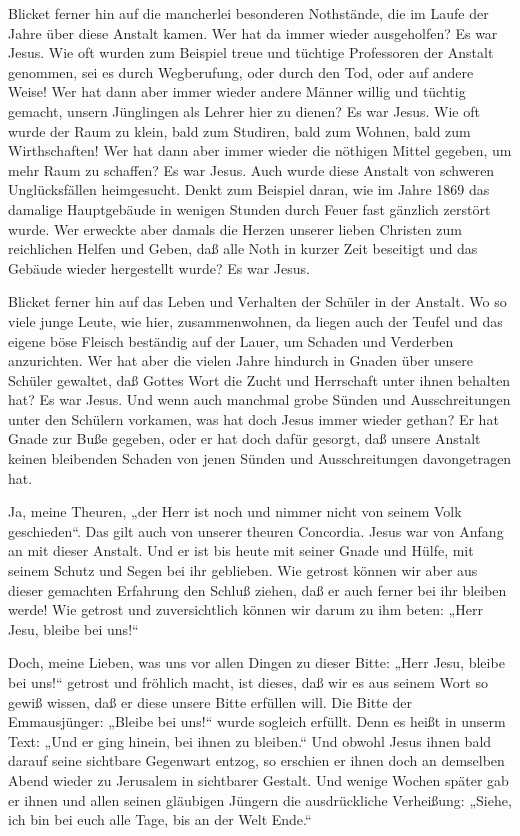 Blicket ferner hin auf die mancherlei besonderen Nothstände, die im Laufe der Jahre über diese Anstalt kamen. Wer hat da immer wieder ausgeholfen? Es war Jesus. Wie oft wurden zum Beispiel treue und tüchtige Professoren der Anstalt genommen, sei es durch Wegberufung, oder durch den Tod, oder auf andere Weise! Wer hat dann aber immer wieder andere Männer willig und tüchtig gemacht, unsern Jünglingen als Lehrer hier zu dienen? Es war Jesus. Wie oft wurde der Raum zu klein, bald zum Studiren, bald zum Wohnen, bald zum Wirthschaften! Wer hat dann aber immer wieder die nöthigen Mittel gegeben, um mehr Raum zu schaffen? Es war Jesus. Auch wurde diese Anstalt von schweren Unglücksfällen heimgesucht. Denkt zum Beispiel daran, wie im Jahre 1869 das damalige Hauptgebäude in wenigen Stunden durch Feuer fast gänzlich zerstört wurde. Wer erweckte aber damals die Herzen unserer lieben Christen zum reichlichen Helfen und Geben, daß alle Noth in kurzer Zeit beseitigt und das Gebäude wieder hergestellt wurde? Es war Jesus.

Blicket ferner hin auf das Leben und Verhalten der Schüler in der Anstalt. Wo so viele junge Leute, wie hier, zusammenwohnen, da liegen auch der Teufel und das eigene böse Fleisch beständig auf der Lauer, um Schaden und Verderben anzurichten. Wer hat aber die vielen Jahre hindurch in Gnaden über unsere Schüler gewaltet, daß Gottes Wort die Zucht und Herrschaft unter ihnen behalten hat? Es war Jesus. Und wenn auch manchmal grobe Sünden und Ausschreitungen unter den Schülern vorkamen, was hat doch Jesus immer wieder gethan? Er hat Gnade zur Buße gegeben, oder er hat doch dafür gesorgt, daß unsere Anstalt keinen bleibenden Schaden von jenen Sünden und Ausschreitungen davongetragen hat.

Ja, meine Theuren, „der Herr ist noch und nimmer nicht von seinem Volk geschieden“. Das gilt auch von unserer theuren Concordia. Jesus war von Anfang an mit dieser Anstalt. Und er ist bis heute mit seiner Gnade und Hülfe, mit seinem Schutz und Segen bei ihr geblieben. Wie getrost können wir aber aus dieser gemachten Erfahrung den Schluß ziehen, daß er auch ferner bei ihr bleiben werde! Wie getrost und zuversichtlich können wir darum zu ihm beten: „Herr Jesu, bleibe bei uns!“

Doch, meine Lieben, was uns vor allen Dingen zu dieser Bitte: „Herr Jesu, bleibe bei uns!“ getrost und fröhlich macht, ist dieses, daß wir es aus seinem Wort so gewiß wissen, daß er diese unsere Bitte erfüllen will. Die Bitte der Emmausjünger: „Bleibe bei uns!“ wurde sogleich erfüllt. Denn es heißt in unserm Text: „Und er ging hinein, bei ihnen zu bleiben.“ Und obwohl Jesus ihnen bald darauf seine sichtbare Gegenwart entzog, so erschien er ihnen doch an demselben Abend wieder zu Jerusalem in sichtbarer Gestalt. Und wenige Wochen später gab er ihnen und allen seinen gläubigen Jüngern die ausdrückliche Verheißung: „Siehe, ich bin bei euch alle Tage, bis an der Welt Ende.“


